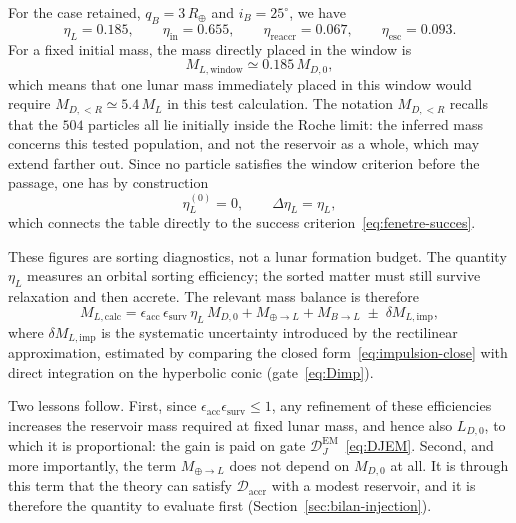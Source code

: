 \documentclass[11pt,a4paper,openany]{report}
\newcommand{\Rt}{R_{\oplus}}
\begin{document}
For the case retained, $q_B=3\,\Rt$ and $i_B=25^\circ$, we have
\begin{equation}
\eta_L=0.185,\qquad \eta_{\mathrm{in}}=0.655,\qquad
\eta_{\mathrm{reaccr}}=0.067,\qquad \eta_{\mathrm{esc}}=0.093 .
\label{eq:pilot-case}
\end{equation}
For a fixed initial mass, the mass directly placed in the window is
\begin{equation}
M_{L,\mathrm{window}}\simeq0.185\,M_{D,0},
\label{eq:MLwindow}
\end{equation}
which means that one lunar mass immediately placed in this window would require
$M_{D,<R}\simeq5.4\,M_L$ in this test calculation. The notation $M_{D,<R}$ recalls that the $504$
particles all lie initially inside the Roche limit: the inferred mass concerns this tested
population, and not the reservoir as a whole, which may extend farther out. Since no particle
satisfies the window criterion before the passage, one has by construction
\begin{equation}
\eta_L^{(0)}=0,\qquad \Delta\eta_L=\eta_L,
\label{eq:deltaetaL}
\end{equation}
which connects the table directly to the success criterion~\eqref{eq:fenetre-succes}.

These figures are sorting diagnostics, not a lunar formation budget. The quantity $\eta_L$ measures
an orbital sorting efficiency; the sorted matter must still survive relaxation and then accrete.
The relevant mass balance is therefore
\begin{equation}
\boxed{\;
M_{L,\mathrm{calc}}=
\epsilon_{\mathrm{acc}}\,\epsilon_{\mathrm{surv}}\,\eta_L\,M_{D,0}
+M_{\oplus\to L}+M_{B\to L}
\;\pm\;\delta M_{L,\mathrm{imp}},
\;}
\label{eq:MLcalc-eff}
\end{equation}
where $\delta M_{L,\mathrm{imp}}$ is the systematic uncertainty introduced by the rectilinear
approximation, estimated by comparing the closed form~\eqref{eq:impulsion-close} with direct
integration on the hyperbolic conic (gate~\eqref{eq:Dimp}).

Two lessons follow. First, since $\epsilon_{\mathrm{acc}}\epsilon_{\mathrm{surv}}\le1$, any
refinement of these efficiencies increases the reservoir mass required at fixed lunar mass, and
hence also $L_{D,0}$, to which it is proportional: the gain is paid on gate
$\mathcal{D}_J^{\mathrm{EM}}$~\eqref{eq:DJEM}. Second, and more importantly, the term
$M_{\oplus\to L}$ does not depend on $M_{D,0}$ at all. It is through this term that the theory can
satisfy $\mathcal{D}_{\mathrm{accr}}$ with a modest reservoir, and it is therefore the quantity to
evaluate first (Section~\ref{sec:bilan-injection}).
\end{document}
